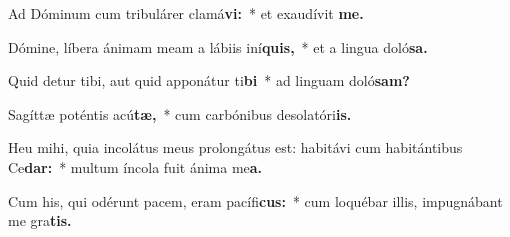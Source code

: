 \item Ad Dóminum cum tribulárer clamá\textbf{vi:}~* et exaudívit \textbf{me.}
\item Dómine, líbera ánimam meam a lábiis iní\textbf{quis,}~* et a lingua doló\textbf{sa.}
\item Quid detur tibi, aut quid apponátur ti\textbf{bi}~* ad linguam doló\textbf{sam?}
\item Sagíttæ poténtis acú\textbf{tæ,}~* cum carbónibus desolatóri\textbf{is.}
\item Heu mihi, quia incolátus meus prolongátus est: habitávi cum habitántibus Ce\textbf{dar:}~* multum íncola fuit ánima me\textbf{a.}
\item Cum his, qui odérunt pacem, eram pacífi\textbf{cus:}~* cum loquébar illis, impugnábant me gra\textbf{tis.}